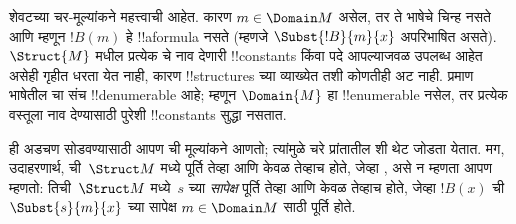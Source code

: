 \documentclass[../../../include/open-logic-section]{subfiles}
\begin{document}
\begin{explain}
शेवटच्या 
चर-मूल्यांकने महत्त्वाची आहेत.
कारण $m \in \Domain M$ असेल, तर ते भाषेचे चिन्ह नसते आणि म्हणून
$!B(m)$ हे !!a{formula} नसते (म्हणजे $\Subst{!B}{m}{x}$ अपरिभाषित
असते).~$\Struct{M}$ मधील प्रत्येक चे नाव देणारी
!!{constant}s किंवा पदे
आपल्याजवळ उपलब्ध आहेत असेही गृहीत धरता येत नाही, कारण !!{structure}s
च्या व्याख्येत तशी कोणतीही अट नाही. प्रमाण भाषेतील चा
संच !!{denumerable} आहे; म्हणून $\Domain{M}$ हा !!{enumerable} नसेल,
तर प्रत्येक वस्तूला नाव देण्यासाठी पुरेशी !!{constant}s सुद्धा नसतात.

ही अडचण सोडवण्यासाठी आपण ची मूल्यांकने आणतो; त्यांमुळे
चरे प्रांतातील शी थेट जोडता येतात. मग, उदाहरणार्थ,
 ची~$\Struct M$
मध्ये पूर्ति तेव्हा आणि केवळ तेव्हाच होते, जेव्हा
, असे न म्हणता आपण म्हणतो:
तिची~$\Struct M$ मध्ये~$s$ च्या \emph{सापेक्ष} पूर्ति तेव्हा आणि केवळ
तेव्हाच होते, जेव्हा $!B(x)$ ची~$\Subst{s}{m}{x}$ च्या सापेक्ष
 $m \in \Domain M$ साठी पूर्ति होते.
\end{explain}
\end{document}

